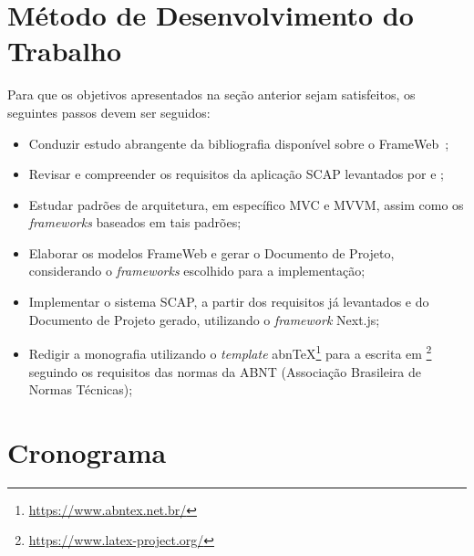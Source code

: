 \section{Método de Desenvolvimento do Trabalho}
\label{sec-intro-met}

Para que os objetivos apresentados na seção anterior sejam satisfeitos, os seguintes passos devem ser seguidos:

\begin{itemize}
    \item Conduzir estudo abrangente da bibliografia disponível sobre o FrameWeb~\cite{souza:2007,souza:2020};
    \item Revisar e compreender os requisitos da aplicação SCAP levantados por  e ;
    \item Estudar padrões de arquitetura, em específico MVC e MVVM, assim como os \textit{frameworks} baseados em tais padrões;
    \item Elaborar os modelos FrameWeb e gerar o Documento de Projeto, considerando o \textit{frameworks} escolhido para a implementação;
    \item Implementar o sistema SCAP, a partir dos requisitos já levantados e do Documento de Projeto gerado, utilizando o \textit{framework} Next.js;
    \item Redigir a monografia utilizando o \textit{template} abnTeX\footnote{\url{https://www.abntex.net.br/}} para a escrita em \latex\footnote{\url{https://www.latex-project.org/}} seguindo os requisitos das normas da ABNT (Associação Brasileira de Normas Técnicas);
\end{itemize}


\section{Cronograma}
\label{sec-intro-crono}


